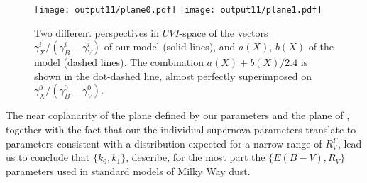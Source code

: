 \documentclass{aastex61}   	%
\begin{document}
\begin{figure}[htbp] %
   \centering
   \texttt{[image: output11/plane0.pdf]}
   \texttt{[image: output11/plane1.pdf]}
   \caption{
   \color{red}
   Two different perspectives in $UVI$-space of the vectors $\gamma^i_X/(\gamma^i_B-\gamma^i_V)$ of our model (solid lines),
   and $a(X)$, $b(X)$ of the  model (dashed lines).  The combination $a(X)+b(X)/2.4$ is shown in the dot-dashed
   line, almost perfectly superimposed on $\gamma^0_X/(\gamma^0_B-\gamma^0_V)$.
   \color{black}
   \label{plane:fig}}
\end{figure}

\color{black}

%
%
%

The near coplanarity of the plane defined by our parameters and the plane of  , together with the fact that our the individual supernova
parameters translate to   parameters consistent with a distribution expected for a narrow range of $R^F_V$, lead us to conclude that 
$\{k_0, k_1\}$, describe, for the most part the $\{ E(B-V), R_V\}$ parameters used
in standard models of Milky Way dust.
\end{document}
